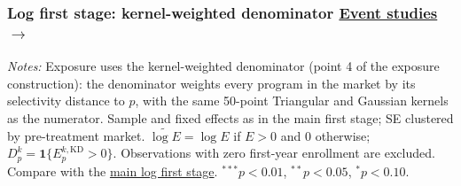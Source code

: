 \documentclass{beamer}
\begin{document}
\begin{frame}[label=sua-kd-log-first-stage]

\frametitle{
    Log first stage: kernel-weighted denominator
    \hfill
    \hyperlink{sua-kd-log-event-studies}{\scriptsize\color{blue}Event studies $\rightarrow$}
}

\centering

\vspace{0.2cm}


\vspace{0.3cm}

\vspace{-0.2cm}

\resizebox{0.66\textwidth}{!}{}

\vspace{0.08cm}

\parbox{0.97\textwidth}{%
\tiny
\textit{Notes:}
Exposure uses the kernel-weighted denominator (point 4 of the exposure construction): the denominator weights every program in the market by its selectivity distance to $p$, with the same 50-point Triangular and Gaussian kernels as the numerator. Sample and fixed effects as in the main first stage; SE clustered by pre-treatment market.
$\widetilde{\log E}=\log E$ if $E>0$ and 0 otherwise; $D_p^k=\mathbf{1}\{E_p^{k,\mathrm{KD}}>0\}$.
Observations with zero first-year enrollment are excluded. Compare with the
\hyperlink{sua-log-first-stage}{\color{blue}main log first stage}.
$^{***}p<0.01$, $^{**}p<0.05$, $^{*}p<0.10$.
}

\end{frame}





\end{document}
